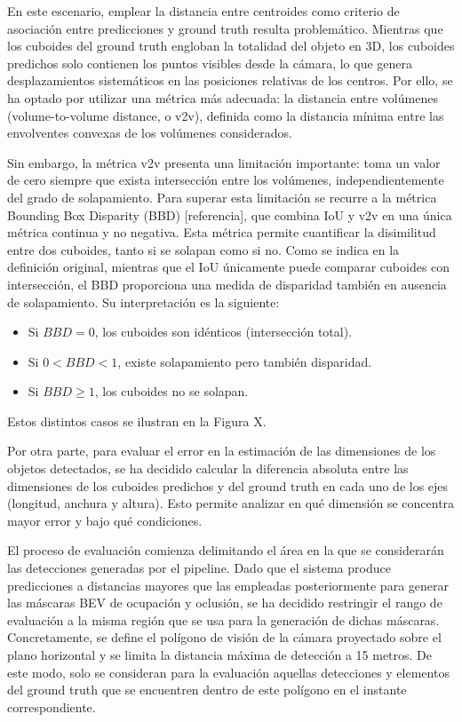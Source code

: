 En este escenario, emplear la distancia entre centroides como criterio de asociación entre predicciones y ground truth resulta problemático. Mientras que los cuboides del ground truth engloban la totalidad del objeto en 3D, los cuboides predichos solo contienen los puntos visibles desde la cámara, lo que genera desplazamientos sistemáticos en las posiciones relativas de los centros. Por ello, se ha optado por utilizar una métrica más adecuada: la distancia entre volúmenes (volume-to-volume distance, o v2v), definida como la distancia mínima entre las envolventes convexas de los volúmenes considerados.

Sin embargo, la métrica v2v presenta una limitación importante: toma un valor de cero siempre que exista intersección entre los volúmenes, independientemente del grado de solapamiento. Para superar esta limitación se recurre a la métrica Bounding Box Disparity (BBD) [referencia], que combina IoU y v2v en una única métrica continua y no negativa. Esta métrica permite cuantificar la disimilitud entre dos cuboides, tanto si se solapan como si no. Como se indica en la definición original, mientras que el IoU únicamente puede comparar cuboides con intersección, el BBD proporciona una medida de disparidad también en ausencia de solapamiento. Su interpretación es la siguiente:

\begin{itemize}
    \item Si $BBD = 0$, los cuboides son idénticos (intersección total).
    \item Si $0 < BBD < 1$, existe solapamiento pero también disparidad.
    \item Si $BBD \geq 1$, los cuboides no se solapan.
\end{itemize}

Estos distintos casos se ilustran en la Figura X.

Por otra parte, para evaluar el error en la estimación de las dimensiones de los objetos detectados, se ha decidido calcular la diferencia absoluta entre las dimensiones de los cuboides predichos y del ground truth en cada uno de los ejes (longitud, anchura y altura). Esto permite analizar en qué dimensión se concentra mayor error y bajo qué condiciones.

El proceso de evaluación comienza delimitando el área en la que se considerarán las detecciones generadas por el pipeline. Dado que el sistema produce predicciones a distancias mayores que las empleadas posteriormente para generar las máscaras BEV de ocupación y oclusión, se ha decidido restringir el rango de evaluación a la misma región que se usa para la generación de dichas máscaras. Concretamente, se define el polígono de visión de la cámara proyectado sobre el plano horizontal y se limita la distancia máxima de detección a 15 metros. De este modo, solo se consideran para la evaluación aquellas detecciones y elementos del ground truth que se encuentren dentro de este polígono en el instante correspondiente.

